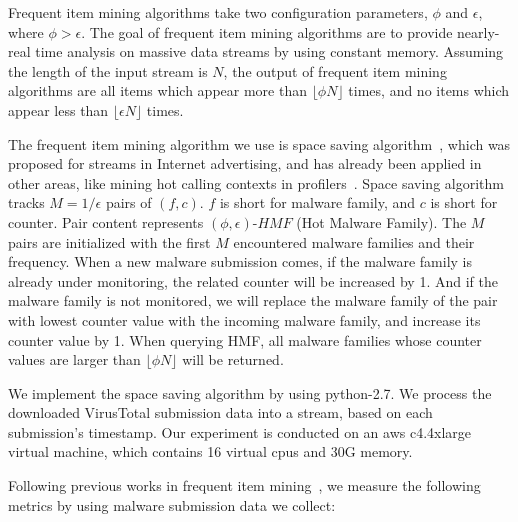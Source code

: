 Frequent item mining algorithms take two configuration parameters, $\phi$ and $\epsilon$, where $\phi > \epsilon$. 
The goal of frequent item mining algorithms are to provide nearly-real time analysis on massive data streams by using constant memory. 
Assuming the length of the input stream is $N$, the output of frequent item mining algorithms 
are all items which appear more than $\lfloor \phi N \rfloor$ times, 
and no items which appear less than  $\lfloor \epsilon N \rfloor$ times. 

The frequent item mining algorithm we use is space saving algorithm~\cite{space-saving}, 
which was proposed for streams in Internet advertising, and has already been applied in other areas, 
like mining hot calling contexts in profilers~\cite{hot-calling-context}.
Space saving algorithm tracks $M=1/\epsilon$ pairs of $(f, c)$. 
$f$ is short for malware family, and $c$ is short for counter.  
Pair content represents $(\phi, \epsilon)\mbox{-}HMF$ (Hot Malware Family). 
The $M$ pairs are initialized with the first $M$ encountered malware families and their frequency. 
When a new malware submission comes, 
if the malware family is already under monitoring, 
the related counter will be increased by 1. 
And if the malware family is not monitored, 
we will replace the malware family of the pair with lowest counter value with the incoming malware family, 
and increase its counter value by 1. 
When querying HMF, 
all malware families whose counter values are larger than $\lfloor \phi N \rfloor$ will be returned. 

\label{sec:eval1}

We implement the space saving algorithm by using python-2.7.
We process the downloaded VirusTotal submission data into a stream, 
based on each submission's timestamp. 
Our experiment is conducted on an aws c4.4xlarge virtual machine, 
which contains 16 virtual cpus and 30G memory. 

Following previous works in frequent item mining~\cite{hot-calling-context}, 
we measure the following metrics by using malware submission data we collect:

